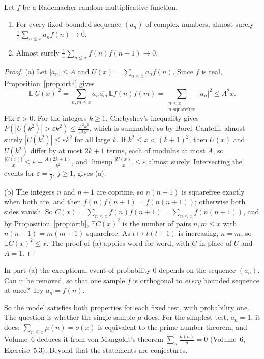 \begin{proposition}\label{prop:modelchowla}
Let $f$ be a Rademacher random multiplicative function.
\begin{enumerate}[label=(\alph*)]
\item For every fixed bounded sequence $(a_n)$ of complex numbers, almost surely $\frac1x\sum_{n\le x}a_nf(n)\to0$.
\item Almost surely $\frac1x\sum_{n\le x}f(n)f(n+1)\to0$.
\end{enumerate}
\end{proposition}
\begin{proof}
(a) Let $|a_n|\le A$ and $U(x)=\sum_{n\le x}a_nf(n)$. Since $f$ is real, Proposition~\ref{prop:orth} gives
\[
\mathbb E|U(x)|^2=\sum_{n,m\le x}a_n\overline{a_m}\,\mathbb Ef(n)f(m)=\sum_{\substack{n\le x\\n\text{ squarefree}}}|a_n|^2\le A^2x.
\]
Fix $\varepsilon>0$. For the integers $k\ge1$, Chebyshev's inequality gives $P(|U(k^2)|>\varepsilon k^2)\le\frac{A^2k^2}{\varepsilon^2k^4}$, which is summable, so by Borel--Cantelli, almost surely $|U(k^2)|\le\varepsilon k^2$ for all large $k$. If $k^2\le x<(k+1)^2$, then $U(x)$ and $U(k^2)$ differ by at most $2k+1$ terms, each of modulus at most $A$, so $\frac{|U(x)|}x\le\varepsilon+\frac{A(2k+1)}{k^2}$, and $\limsup\frac{|U(x)|}x\le\varepsilon$ almost surely. Intersecting the events for $\varepsilon=\frac1j$, $j\ge1$, gives (a).

(b) The integers $n$ and $n+1$ are coprime, so $n(n+1)$ is squarefree exactly when both are, and then $f(n)f(n+1)=f(n(n+1))$; otherwise both sides vanish. So $C(x)=\sum_{n\le x}f(n)f(n+1)=\sum_{n\le x}f(n(n+1))$, and by Proposition~\ref{prop:orth}, $\mathbb EC(x)^2$ is the number of pairs $n,m\le x$ with $n(n+1)=m(m+1)$ squarefree. As $t\mapsto t(t+1)$ is increasing, $n=m$, so $\mathbb EC(x)^2\le x$. The proof of (a) applies word for word, with $C$ in place of $U$ and $A=1$.
\end{proof}

\begin{think}
In part (a) the exceptional event of probability $0$ depends on the sequence $(a_n)$. Can it be removed, so that one sample $f$ is orthogonal to \emph{every} bounded sequence at once? Try $a_n=f(n)$.
\end{think}

So the model satisfies both properties for each fixed test, with probability one. The question is whether the single sample $\mu$ does. For the simplest test, $a_n=1$, it does: $\sum_{n\le x}\mu(n)=o(x)$ is equivalent to the prime number theorem, and Volume~6 deduces it from von Mangoldt's theorem $\sum_n\frac{\mu(n)}n=0$ (Volume~6, Exercise~5.3). Beyond that the statements are conjectures.

